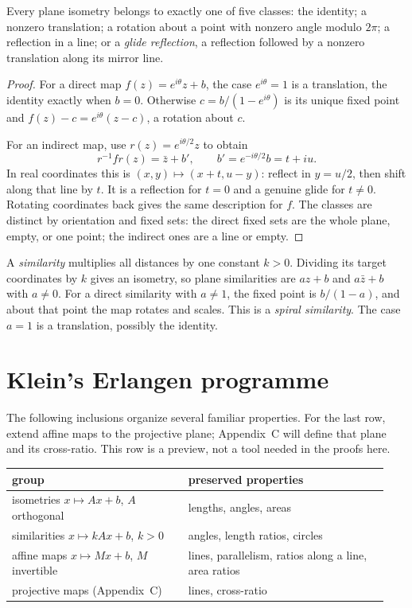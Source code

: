 \begin{theorem}\label{geometry:thm:chasles}
Every plane isometry belongs to exactly one of five classes: the identity; a nonzero translation; a rotation about a point with nonzero angle modulo $2\pi$; a reflection in a line; or a \emph{glide reflection}, a reflection followed by a nonzero translation along its mirror line.
\end{theorem}
\begin{proof}
For a direct map $f(z)=e^{i\theta}z+b$, the case $e^{i\theta}=1$ is a translation, the identity exactly when $b=0$. Otherwise $c=b/(1-e^{i\theta})$ is its unique fixed point and $f(z)-c=e^{i\theta}(z-c)$, a rotation about $c$.

For an indirect map, use $r(z)=e^{i\theta/2}z$ to obtain
\[
r^{-1}fr(z)=\bar z+b',\qquad b'=e^{-i\theta/2}b=t+iu.
\]
In real coordinates this is $(x,y)\mapsto(x+t,u-y)$: reflect in $y=u/2$, then shift along that line by $t$. It is a reflection for $t=0$ and a genuine glide for $t\ne0$. Rotating coordinates back gives the same description for $f$. The classes are distinct by orientation and fixed sets: the direct fixed sets are the whole plane, empty, or one point; the indirect ones are a line or empty.
\end{proof}

A \emph{similarity} multiplies all distances by one constant $k>0$. Dividing its target coordinates by $k$ gives an isometry, so plane similarities are $az+b$ and $a\bar z+b$ with $a\ne0$. For a direct similarity with $a\ne1$, the fixed point is $b/(1-a)$, and about that point the map rotates and scales. This is a \emph{spiral similarity}. The case $a=1$ is a translation, possibly the identity.

\section{Klein's Erlangen programme}

The following inclusions organize several familiar properties. For the last row, extend affine maps to the projective plane; Appendix~C will define that plane and its cross-ratio. This row is a preview, not a tool needed in the proofs here.

\medskip
\begin{center}
\begin{tabular}{@{}p{0.44\linewidth}p{0.5\linewidth}@{}}
\hline
group & preserved properties\\
\hline
isometries $x\mapsto Ax+b$, $A$ orthogonal & lengths, angles, areas\\
similarities $x\mapsto kAx+b$, $k>0$ & angles, length ratios, circles\\
affine maps $x\mapsto Mx+b$, $M$ invertible & lines, parallelism, ratios along a line, area ratios\\
projective maps (Appendix~C) & lines, cross-ratio\\
\hline
\end{tabular}
\end{center}
\medskip

